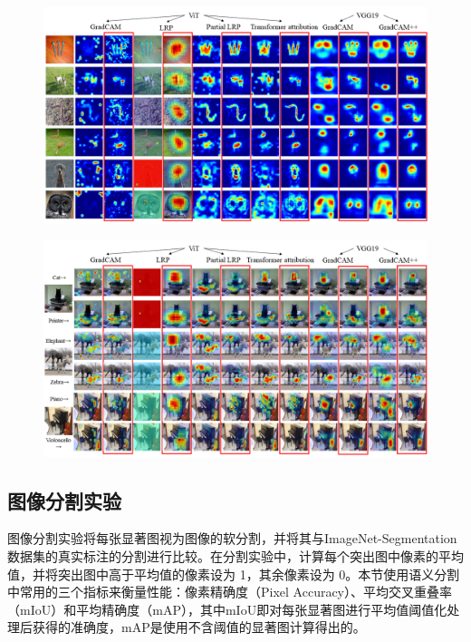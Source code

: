 \begin{figure}[h]
	\centering 
	\includegraphics[width=15cm]{fig/ch4/Contrast1.png}
	\label{fig:contrast2}
\end{figure}

\begin{figure}[h]
	\centering 
	\includegraphics[width=15cm]{fig/ch4/classSensitive.png}
	\label{fig:classSensitive}
\end{figure}
	
\subsection{图像分割实验}
图像分割实验将每张显著图视为图像的软分割，并将其与ImageNet-Segmentation数据集的真实标注的分割进行比较。在分割实验中，计算每个突出图中像素的平均值，并将突出图中高于平均值的像素设为 1，其余像素设为 0。本节使用语义分割中常用的三个指标来衡量性能：像素精确度（Pixel Accuracy）、平均交叉重叠率（mIoU）和平均精确度（mAP），其中mIoU即对每张显著图进行平均值阈值化处理后获得的准确度，mAP是使用不含阈值的显著图计算得出的。

